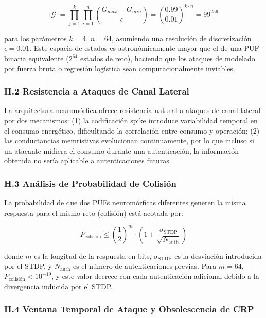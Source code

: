 \begin{equation}
    |\mathcal{G}| = \prod_{j=1}^{k} \prod_{i=1}^{n} \left( \frac{G_{max} - G_{min}}{\epsilon} \right) = \left( \frac{0.99}{0.01} \right)^{k \cdot n} = 99^{256}
    \label{eq:state_space}
\end{equation}

para los parámetros $k=4$, $n=64$, asumiendo una resolución de discretización $\epsilon = 0.01$. Este espacio de estados es astronómicamente mayor que el de una PUF binaria equivalente ($2^{64}$ estados de reto), haciendo que los ataques de modelado por fuerza bruta o regresión logística sean computacionalmente inviables.

\subsubsection*{H.2 Resistencia a Ataques de Canal Lateral}

La arquitectura neuromórfica ofrece resistencia natural a ataques de canal lateral por dos mecanismos: (1) la codificación spike introduce variabilidad temporal en el consumo energético, dificultando la correlación entre consumo y operación; (2) las conductancias memristivas evolucionan continuamente, por lo que incluso si un atacante midiera el consumo durante una autenticación, la información obtenida no sería aplicable a autenticaciones futuras.

\subsubsection*{H.3 Análisis de Probabilidad de Colisión}

La probabilidad de que dos PUFs neuromórficas diferentes generen la misma respuesta para el mismo reto (colisión) está acotada por:

\begin{equation}
    P_{\text{colisión}} \leq \left( \frac{1}{2} \right)^{m} \cdot \left( 1 + \frac{\sigma_{\text{STDP}}}{\sqrt{N_{\text{auth}}}} \right)
    \label{eq:collision}
\end{equation}

donde $m$ es la longitud de la respuesta en bits, $\sigma_{\text{STDP}}$ es la desviación introducida por el STDP, y $N_{\text{auth}}$ es el número de autenticaciones previas. Para $m=64$, $P_{\text{colisión}} < 10^{-19}$, y este valor decrece con cada autenticación adicional debido a la divergencia inducida por el STDP.

\subsubsection*{H.4 Ventana Temporal de Ataque y Obsolescencia de CRP}

